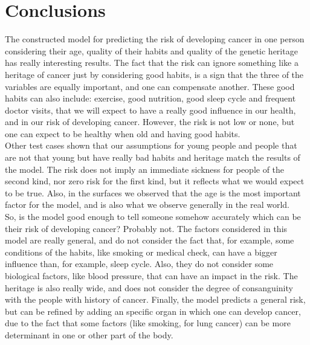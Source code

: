 \documentclass[conference]{IEEEtran}
\begin{document}
\section{Conclusions}
The constructed model for predicting the risk of developing cancer in one person considering their age, quality of their habits and quality of the genetic heritage has really interesting results. The fact that the risk can ignore something like a heritage of cancer just by considering good habits, is a sign that the three of the variables are equally important, and one can compensate another. These good habits can also include: exercise, good nutrition, good sleep cycle and frequent doctor visits, that we will expect to have a really good influence in our health, and in our risk of developing cancer. However, the risk is not low or none, but one can expect to be healthy when old and having good habits. \\
Other test cases shown that our assumptions for young people and people that are not that young but have really bad habits and heritage match the results of the model. The risk does not imply an immediate sickness for people of the second kind, nor zero risk for the first kind, but it reflects what we would expect to be true. Also, in the surfaces we observed that the age is the most important factor for the model, and is also what we observe generally in the real world. \\
So, is the model good enough to tell someone somehow accurately which can be their risk of developing cancer? Probably not. The factors considered in this model are really general, and do not consider the fact that, for example, some conditions of the habits, like smoking or medical check, can have a bigger influence than, for example, sleep cycle. Also, they do not consider some biological factors, like blood pressure, that can have an impact in the risk. The heritage is also really wide, and does not consider the degree of consanguinity with the people with history of cancer. Finally, the model predicts a general risk, but can be refined by adding an specific organ in which one can develop cancer, due to the fact that some factors (like smoking, for lung cancer) can be more determinant in one or other part of the body.

\nocite{*}


\end{document}
